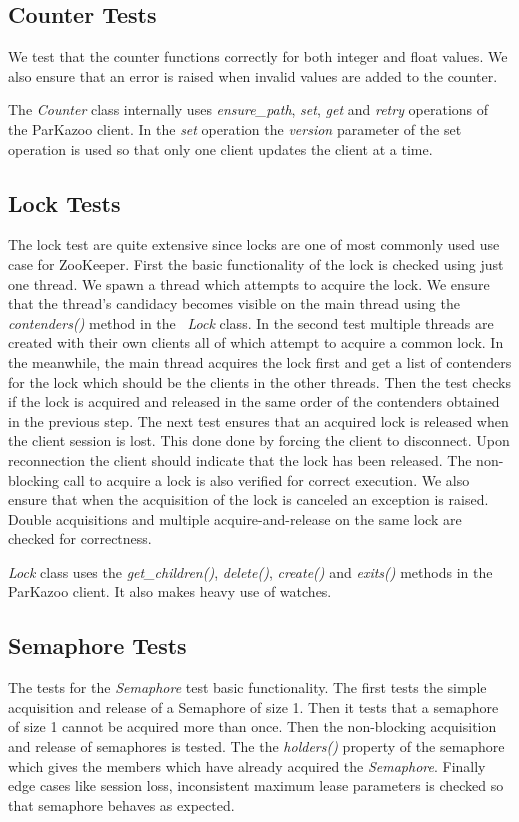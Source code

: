 	\subsection{Counter Tests}
	
	We test that the counter functions correctly for both integer and float values. We also ensure that an error is raised when invalid values are added to the counter.
	
	The \textit{Counter} class internally uses \textit{ensure\_path}, \textit{set}, \textit{get} and \textit{retry} operations of the ParKazoo client. In the \textit{set} operation the \textit{version} parameter of the set operation is used so that only one client updates the client at a time.
	
	\subsection{Lock Tests}
	The lock test are quite extensive since locks are one of most commonly used use case for ZooKeeper. First the basic functionality of the lock is checked using just one thread. We spawn a thread which attempts to acquire the lock. We ensure that the thread's candidacy becomes visible on the main thread using the \textit{contenders()} method in the ~\textit{Lock} class. In the second test multiple threads are created with their own clients all of which attempt to acquire a common lock. In the meanwhile, the main thread acquires the lock first and get a list of contenders for the lock which should be the clients in the other threads. Then the test checks if the lock is acquired and released in the same order of the contenders obtained in the previous step. The next test ensures that an acquired lock is released when the client session is lost. This done done by forcing the client to disconnect. Upon reconnection the client should indicate that the lock has been released. The non-blocking call to acquire a lock is also verified for correct execution. We also ensure that when the acquisition of the lock is canceled an exception is raised. Double acquisitions and multiple acquire-and-release on the same lock are checked for correctness.
	
	\textit{Lock} class uses the \textit{get\_children()}, \textit{delete()}, \textit{create()} and \textit{exits()} methods in the ParKazoo client. It also makes heavy use of watches.
	
	\subsection{Semaphore Tests}
	The tests for the \textit{Semaphore} test basic functionality. The first tests the simple acquisition and release of a Semaphore of size 1. Then it tests that a semaphore of size 1 cannot be acquired more than once. Then the non-blocking acquisition and release of semaphores is tested. The the \textit{holders()} property of the semaphore which gives the members which have already acquired the \textit{Semaphore}. Finally edge cases like session loss, inconsistent maximum lease parameters is checked so that semaphore behaves as expected.
		
